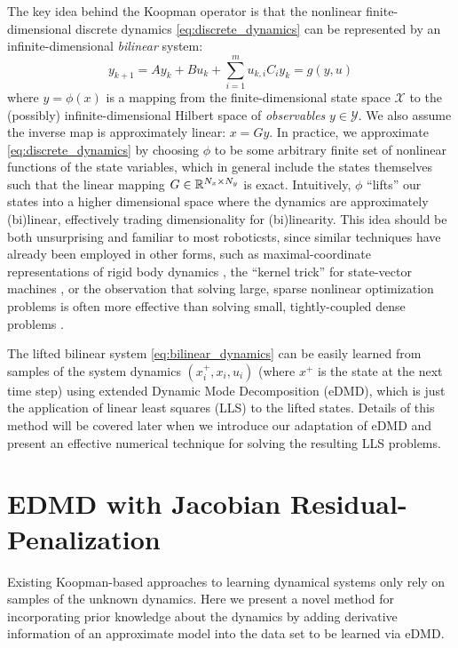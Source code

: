 \documentclass{article}
\begin{document}
  The key idea behind the Koopman operator is that the nonlinear finite-dimensional discrete
  dynamics \eqref{eq:discrete_dynamics} can be represented by an infinite-dimensional
  \textit{bilinear} system:
  \begin{equation} \label{eq:bilinear_dynamics}
      y_{k+1} = A y_k + B u_k + \sum_{i=1}^m u_{k,i} C_i y_k = g(y,u)
  \end{equation}
  where $y = \phi(x)$ is a mapping from the finite-dimensional state space $\mathcal{X}$ to
  the (possibly) infinite-dimensional Hilbert space of \textit{observables} $y \in
  \mathcal{Y}$. We also assume the inverse map is approximately linear: $x = G y$. In
  practice, we approximate \eqref{eq:discrete_dynamics} by choosing $\phi$ to be some
  arbitrary finite set of nonlinear functions of the state variables, which in general
  include the states themselves such that the linear mapping $G \in \mathbb{R}^{N_x \times N_y}$ is
  exact.  Intuitively, $\phi$ ``lifts'' our states into a higher dimensional space where the
  dynamics are approximately (bi)linear, effectively trading dimensionality for
  (bi)linearity. This idea should be both unsurprising and familiar to most roboticsts,
  since similar techniques have already been employed in other forms, such as
  maximal-coordinate representations of rigid body dynamics
  \cite{baraff_linear-time_1996-1,Brudigam2021a,Howell2022}, the
  ``kernel trick'' for state-vector machines \cite{Hofmann2006}, or the observation that
  solving large, sparse nonlinear optimization problems is often more effective than solving
  small, tightly-coupled dense problems .

  The lifted bilinear system \eqref{eq:bilinear_dynamics} can be easily learned from samples
  of the system dynamics $(x_i^+,x_i,u_i)$ (where $x^+$ is the state at the next time step)
  using extended Dynamic Mode Decomposition (eDMD), which is just the application of linear
  least squares (LLS) to the lifted states.  Details of this method will be covered later
  when we introduce our adaptation of eDMD and present an effective numerical technique for
  solving the resulting LLS problems.

\section{EDMD with Jacobian Residual-Penalization} \label{sec:methodology}
  Existing Koopman-based approaches to learning dynamical systems only rely on samples of
  the unknown dynamics. Here we present a novel method for incorporating prior knowledge
  about the dynamics by adding derivative information of an approximate model into the data
  set to be learned via eDMD.
\end{document}
